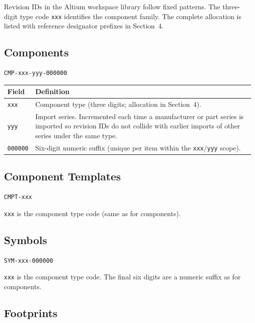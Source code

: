\documentclass[11pt,a4paper]{article}
\begin{document}
Revision IDs in the Altium workspace library follow fixed patterns. The three-digit type code \texttt{xxx} identifies the component family. The complete allocation is listed with reference designator prefixes in Section~4.

\subsection{Components}

\begin{verbatim}
CMP-xxx-yyy-000000
\end{verbatim}

\begin{tabular}{@{}lL{11cm}@{}}
\toprule
Field & Definition \\
\midrule
\texttt{xxx} & Component type (three digits; allocation in Section~4). \\
\texttt{yyy} & Import series. Incremented each time a manufacturer or part series is imported so revision IDs do not collide with earlier imports of other series under the same type. \\
\texttt{000000} & Six-digit numeric suffix (unique per item within the \texttt{xxx}/\texttt{yyy} scope). \\
\bottomrule
\end{tabular}

\subsection{Component Templates}

\begin{verbatim}
CMPT-xxx
\end{verbatim}

\texttt{xxx} is the component type code (same as for components).

\subsection{Symbols}

\begin{verbatim}
SYM-xxx-000000
\end{verbatim}

\texttt{xxx} is the component type code. The final six digits are a numeric suffix as for components.

\subsection{Footprints}
\end{document}
